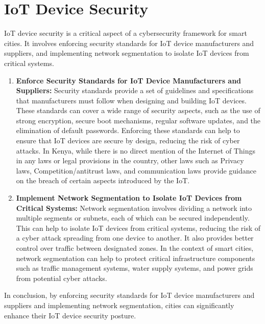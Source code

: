 \documentclass{article}
\begin{document}
\section{IoT Device Security}
IoT device security is a critical aspect of a cybersecurity framework for smart cities. It involves enforcing security standards for IoT device manufacturers and suppliers, and implementing network segmentation to isolate IoT devices from critical systems\cite{australian-cybersecurity-center-2020}\cite{unknown-author-2023}\cite{fernandez-2020}.
\begin{enumerate}[label=\alph*)]
    \item \textbf{Enforce Security Standards for IoT Device Manufacturers and Suppliers:} Security standards provide a set of guidelines and specifications that manufacturers must follow when designing and building IoT devices\cite{australian-cybersecurity-center-2020}\cite{unknown-author-2023}. These standards can cover a wide range of security aspects, such as the use of strong encryption, secure boot mechanisms, regular software updates, and the elimination of default passwords\cite{australian-cybersecurity-center-2020}\cite{unknown-author-2023}. Enforcing these standards can help to ensure that IoT devices are secure by design, reducing the risk of cyber attacks\cite{australian-cybersecurity-center-2020}\cite{unknown-author-2023}. In Kenya, while there is no direct mention of the Internet of Things in any laws or legal provisions in the country, other laws such as Privacy laws, Competition/antitrust laws, and communication laws provide guidance on the breach of certain aspects introduced by the IoT\cite{mulika-2021}.
    \item \textbf{Implement Network Segmentation to Isolate IoT Devices from Critical Systems:} Network segmentation involves dividing a network into multiple segments or subnets, each of which can be secured independently\cite{trend-micro-2021}\cite{wolf-2022A}\cite{juniper-networks-2022}. This can help to isolate IoT devices from critical systems, reducing the risk of a cyber attack spreading from one device to another\cite{trend-micro-2021}\cite{wolf-2022A}\cite{juniper-networks-2022}. It also provides better control over traffic between designated zones\cite{juniper-networks-2022}. In the context of smart cities, network segmentation can help to protect critical infrastructure components such as traffic management systems, water supply systems, and power grids from potential cyber attacks\cite{trend-micro-2021}\cite{wolf-2022A}\cite{juniper-networks-2022}.



\end{enumerate}
In conclusion, by enforcing security standards for IoT device manufacturers and suppliers and implementing network segmentation, cities can significantly enhance their IoT device security posture\cite{australian-cybersecurity-center-2020}\cite{unknown-author-2023}\cite{fernandez-2020}.
\end{document}
